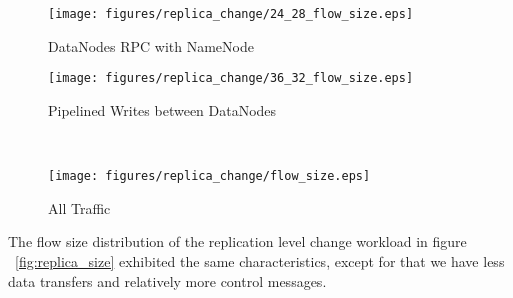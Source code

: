 \begin{figure*}[!htpb]
\centering
  \begin{subfigure}[b]{.45\linewidth}
   \centering
	\texttt{[image: figures/replica\_change/24\_28\_flow\_size.eps]} 
	\caption{DataNodes RPC with NameNode}\label{fig:replica_size:rpc}
   \end{subfigure}%
  \begin{subfigure}[b]{.45\linewidth}
   \centering
	\texttt{[image: figures/replica\_change/36\_32\_flow\_size.eps]} 
	\caption{Pipelined Writes between DataNodes}\label{fig:replica_size:pipe_write}
   \end{subfigure} \\%
  \begin{subfigure}[b]{.55\linewidth}
   \centering
	\texttt{[image: figures/replica\_change/flow\_size.eps]}
	\caption{All Traffic}\label{fig:read_size:all}
   \end{subfigure}%
\caption{Replciation Level Change Flow Size Distribution}
\label{fig:replica_size}
\end{figure*}

The flow size distribution of the replication level change workload in figure ~\ref{fig:replica_size} exhibited the same characteristics, except for that we have less data transfers and relatively more control messages. 


